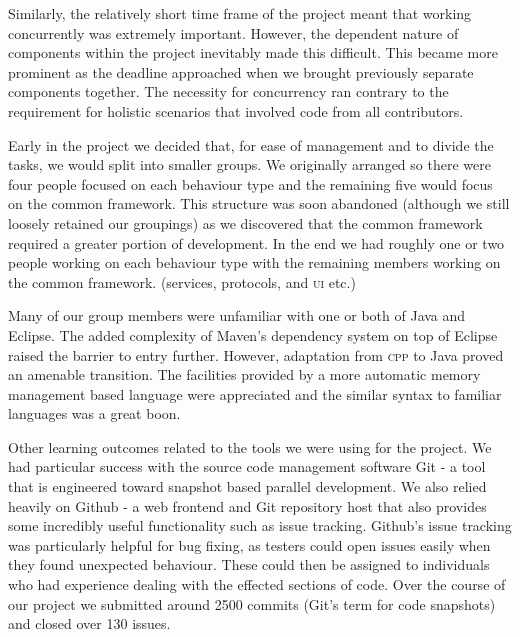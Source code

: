 Similarly, the relatively short time frame of the project meant that working concurrently was extremely important. However, the dependent nature of components within the project inevitably made this difficult. This became more prominent as the deadline approached when we brought previously separate components together. The necessity for concurrency ran contrary to the requirement for holistic scenarios that involved code from all contributors.

Early in the project we decided that, for ease of management and to divide the tasks, we would split into smaller groups. We originally arranged so there were four people focused on each behaviour type and the remaining five would focus on the common framework. This structure was soon abandoned (although we still loosely retained our groupings) as we discovered that the common framework required a greater portion of development. In the end we had roughly one or two people working on each behaviour type with the remaining members working on the common framework. (services, protocols, and \textsc{ui} etc.) 

Many of our group members were unfamiliar with one or both of Java and Eclipse. The added complexity of Maven's dependency system on top of Eclipse raised the barrier to entry further. However, adaptation from \textsc{cpp} to Java proved an amenable transition. The facilities provided by a more automatic memory management based language were appreciated and the similar syntax to familiar languages was a great boon.

Other learning outcomes related to the tools we were using for the project. We had particular success with the source code management software Git - a tool that is engineered toward snapshot based parallel development. We also relied heavily on Github - a web frontend and Git repository host that also provides some incredibly useful functionality such as issue tracking. Github's issue tracking was particularly helpful for bug fixing, as testers could open issues easily when they found unexpected behaviour. These could then be assigned to individuals who had experience dealing with the effected sections of code. Over the course of our project we submitted around 2500 commits (Git's term for code snapshots) and closed over 130 issues.
